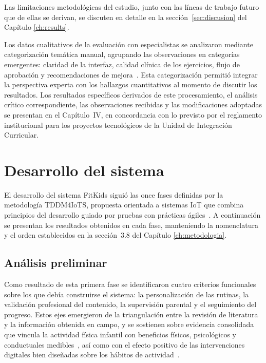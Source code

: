 				Las limitaciones metodológicas del estudio, junto con las líneas de trabajo futuro que de ellas se derivan, se discuten en detalle en la sección~\ref{sec:discusion} del Capítulo \ref{ch:results}.
				
				Los datos cualitativos de la evaluación con especialistas se analizaron mediante categorización temática manual, agrupando las observaciones en categorías emergentes: claridad de la interfaz, calidad clínica de los ejercicios, flujo de aprobación y recomendaciones de mejora~\cite{Creswell2018}. Esta categorización permitió integrar la perspectiva experta con los hallazgos cuantitativos al momento de discutir los resultados. Los resultados específicos derivados de este procesamiento, el análisis crítico correspondiente, las observaciones recibidas y las modificaciones adoptadas se presentan en el Capítulo~IV, en concordancia con lo previsto por el reglamento institucional para los proyectos tecnológicos de la Unidad de Integración Curricular.
				
	\label{ch:results}
		\section{Desarrollo del sistema}
			El desarrollo del sistema FitKids siguió las once fases definidas por la metodología TDDM4IoTS, propuesta orientada a sistemas IoT que combina principios del desarrollo guiado por pruebas con prácticas ágiles~\cite{GuerreroUlloa2024,Fowler2002}. A continuación se presentan los resultados obtenidos en cada fase, manteniendo la nomenclatura y el orden establecidos en la sección~3.8 del Capítulo \ref{ch:metodologia}.
			
			\subsection{Análisis preliminar}
				Como resultado de esta primera fase se identificaron cuatro criterios funcionales sobre los que debía construirse el sistema: la personalización de las rutinas, la validación profesional del contenido, la supervisión parental y el seguimiento del progreso. Estos ejes emergieron de la triangulación entre la revisión de literatura y la información obtenida en campo, y se sostienen sobre evidencia consolidada que vincula la actividad física infantil con beneficios físicos, psicológicos y conductuales medibles~\cite{Guthold2020,Bull2020}, así como con el efecto positivo de las intervenciones digitales bien diseñadas sobre los hábitos de actividad~\cite{Baumann2022,WangJun2024}.
				
